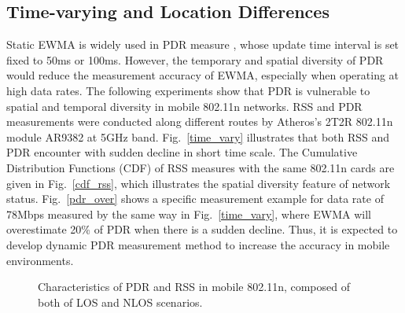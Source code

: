 \documentclass[draftclsnofoot,conference,onecolumn,11pt]{IEEEtran}
\begin{document}
\subsection{Time-varying and Location Differences}
Static EWMA is widely used in PDR measure \cite{ath9k} \cite{minstrel} \cite{wong2008wireless}, whose update time interval is set fixed to 50ms or 100ms. However, the temporary and spatial diversity of PDR would reduce the measurement accuracy of EWMA, especially when operating at high data rates. The following experiments show that PDR is vulnerable to spatial and temporal diversity in mobile 802.11n networks. RSS and PDR measurements were conducted along different routes by Atheros's 2T2R 802.11n module AR9382 at 5GHz band. Fig.~\ref{time_vary} illustrates that both RSS and PDR encounter with sudden decline in short time scale. The Cumulative Distribution Functions (CDF) of RSS measures with the same 802.11n cards are given in Fig.~\ref{cdf_rss}, which illustrates the spatial diversity feature of network status. Fig.~\ref{pdr_over} shows a specific measurement example for data rate of 78Mbps measured by the same way in Fig.~\ref{time_vary}, where EWMA will overestimate 20\% of PDR when there is a sudden decline. Thus, it is expected to develop dynamic PDR measurement method to increase the accuracy in mobile environments.

\begin{figure}[!htp]
\centerline{
}
\caption{Characteristics of PDR and RSS in mobile 802.11n, composed of both of LOS and NLOS scenarios.}
\label{time}
\end{figure}
\end{document}
